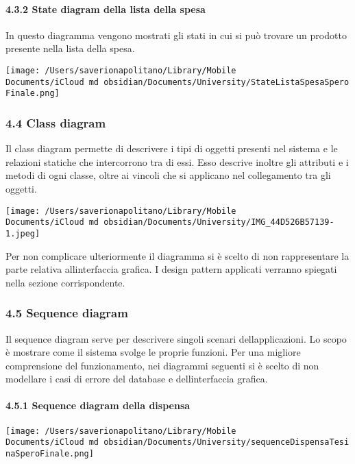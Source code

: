 \documentclass[
]{article}
\begin{document}
\paragraph{4.3.2 State diagram della lista della
spesa}\label{state-diagram-della-lista-della-spesa}

In questo diagramma vengono mostrati gli stati in cui si può trovare un
prodotto presente nella lista della spesa.

\texttt{[image: /Users/saverionapolitano/Library/Mobile Documents/iCloud~md~obsidian/Documents/University/StateListaSpesaSperoFinale.png]}

\subsubsection{4.4 Class diagram}\label{class-diagram}

Il class diagram permette di descrivere i tipi di oggetti presenti nel
sistema e le relazioni statiche che intercorrono tra di essi. Esso
descrive inoltre gli attributi e i metodi di ogni classe, oltre ai
vincoli che si applicano nel collegamento tra gli oggetti.

\texttt{[image: /Users/saverionapolitano/Library/Mobile Documents/iCloud~md~obsidian/Documents/University/IMG\_44D526B57139-1.jpeg]}

Per non complicare ulteriormente il diagramma si è scelto di non
rappresentare la parte relativa all\textquotesingle interfaccia grafica.
I design pattern applicati verranno spiegati nella sezione
corrispondente.

\subsubsection{4.5 Sequence diagram}\label{sequence-diagram}

Il sequence diagram serve per descrivere singoli scenari
dell\textquotesingle applicazioni. Lo scopo è mostrare come il sistema
svolge le proprie funzioni. Per una migliore comprensione del
funzionamento, nei diagrammi seguenti si è scelto di non modellare i
casi di errore del database e dell\textquotesingle interfaccia grafica.

\paragraph{4.5.1 Sequence diagram della
dispensa}\label{sequence-diagram-della-dispensa}

\texttt{[image: /Users/saverionapolitano/Library/Mobile Documents/iCloud~md~obsidian/Documents/University/sequenceDispensaTesinaSperoFinale.png]}
\end{document}
